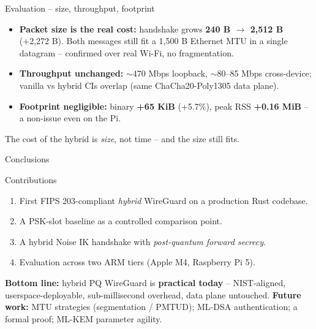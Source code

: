 \documentclass[aspectratio=169,11pt]{beamer}
\begin{document}
\begin{frame}{Evaluation -- size, throughput, footprint}
  \begin{itemize}
    \item \textbf{Packet size is the real cost:} handshake grows
          \textbf{240 B $\to$ 2{,}512 B} (+2{,}272 B). Both messages still fit a
          1{,}500 B Ethernet MTU \alert{in a single datagram} -- confirmed over
          real Wi-Fi, no fragmentation.
    \item \textbf{Throughput unchanged:} $\sim$470 Mbps loopback, $\sim$80--85
          Mbps cross-device; vanilla vs hybrid CIs overlap (same
          ChaCha20-Poly1305 data plane).
    \item \textbf{Footprint negligible:} binary \textbf{+65 KiB} (+5.7\%), peak
          RSS \textbf{+0.16 MiB} -- a non-issue even on the Pi.
  \end{itemize}
  \vfill
  \centering\small\color{pqgray}
  The cost of the hybrid is \emph{size}, not time -- and the size still fits.
\end{frame}

\begin{frame}{Conclusions}
  \begin{block}{Contributions}
    \begin{enumerate}\small
      \item First FIPS 203-compliant \emph{hybrid} WireGuard on a production Rust
            codebase.
      \item A PSK-slot baseline as a controlled comparison point.
      \item A hybrid Noise IK handshake with \emph{post-quantum forward secrecy}.
      \item Evaluation across two ARM tiers (Apple M4, Raspberry Pi 5).
    \end{enumerate}
  \end{block}
  \vfill
  \textbf{Bottom line:} hybrid PQ WireGuard is \textbf{practical today} --
  NIST-aligned, userspace-deployable, sub-millisecond overhead, data plane
  untouched.
  \vfill
  \small\color{pqgray}\textbf{Future work:} MTU strategies (segmentation / PMTUD);
  ML-DSA authentication; a formal proof; ML-KEM parameter agility.
\end{frame}
\end{document}
